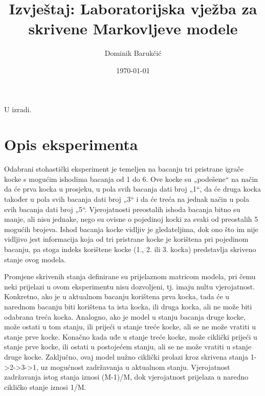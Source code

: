 \documentclass[12pt]{article}
\title{Izvještaj: Laboratorijska vježba za skrivene Markovljeve modele}
\author{Dominik Barukčić}
\date{\today}
\begin{document}
	
	\maketitle
	
%		
%	
%	
	
	
	U izradi.
	
	\section{Opis eksperimenta}
	Odabrani stohastički eksperiment je temeljen na bacanju tri pristrane igrače kocke s mogućim ishodima bacanja od 1 do 6. Ove kocke su „podešene“ na način da će prva kocka u prosjeku, u pola svih bacanja dati broj „1“, da će druga kocka također u pola svih bacanja dati broj „3“ i da će treća na jednak način u pola svih bacanja dati broj „5“. Vjerojatnosti preostalih ishoda bacanja bitno su manje, ali nisu jednake, nego su ovisne o pojedinoj kocki za svaki od preostalih 5 mogućih brojeva. Ishod bacanja kocke vidljiv je gledateljima, dok ono što im nije vidljivo jest informacija koja od tri pristrane kocke je korištena pri pojedinom bacanju, pa stoga indeks korištene kocke (1., 2. ili 3. kocka) predstavlja skriveno stanje ovog modela.
	
	Promjene skrivenih stanja definirane su prijelaznom matricom modela, pri čemu neki prijelazi u ovom eksperimentu nisu dozvoljeni, tj. imaju nultu vjerojatnost. Konkretno, ako je u aktualnom bacanju korištena prva kocka, tada će u narednom bacanju biti korištena ta ista kocka, ili druga kocka, ali ne može biti odabrana treća kocka. Analogno, ako je model u stanju bacanja druge kocke, može ostati u tom stanju, ili prijeći u stanje treće kocke, ali se ne može vratiti u stanje prve kocke. Konačno kada uđe u stanje treće kocke, može ciklički prijeći u stanje prve kocke, ili ostati u postojećem stanju, ali se ne može vratiti u stanje druge kocke. Zaključno, ovaj model nužno ciklički prolazi kroz skrivena stanja 1->2->3->1, uz mogućnost zadržavanja u aktualnom stanju. Vjerojatnost zadržavanja istog stanja iznosi (M-1)/M, dok vjerojatnost prijelaza u naredno cikličko stanje iznosi 1/M.
	
\end{document}

